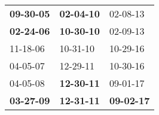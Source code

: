 \begin{supertabular}{p{0.33\columnwidth}p{0.33\columnwidth}p{0.33\columnwidth}}
 \textbf{09-30-05\textsuperscript{}} &  \textbf{02-04-10\textsuperscript{}} &           02-08-13\textsuperscript{} \\
 \textbf{02-24-06\textsuperscript{}} &  \textbf{10-30-10\textsuperscript{}} &           02-09-13\textsuperscript{} \\
          11-18-06\textsuperscript{} &           10-31-10\textsuperscript{} &           10-29-16\textsuperscript{} \\
          04-05-07\textsuperscript{} &           12-29-11\textsuperscript{} &           10-30-16\textsuperscript{} \\
          04-05-08\textsuperscript{} &  \textbf{12-30-11\textsuperscript{}} &           09-01-17\textsuperscript{} \\
 \textbf{03-27-09\textsuperscript{}} &  \textbf{12-31-11\textsuperscript{}} &  \textbf{09-02-17\textsuperscript{}} \\
\end{supertabular}
